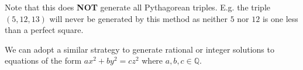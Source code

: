 Note that this does \textbf{NOT} generate all Pythagorean triples. E.g. the triple
$(5,12,13)$ will never be generated by this method as neither $5$ nor $12$ is one
less than a perfect square.
\vspace{1ex}

We can adopt a similar strategy to generate rational or integer solutions to
equations of the form $ax^2+by^2=cz^2$ where $a,b,c\in\mathbb{Q}$.
